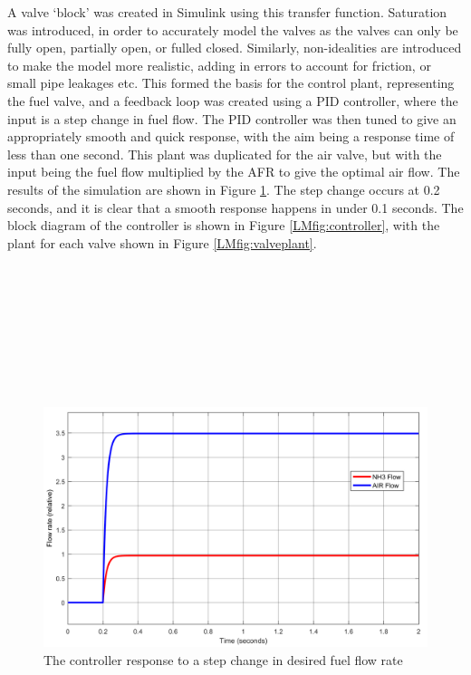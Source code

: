 \documentclass{article}
\begin{document}
A valve `block' was created in Simulink using this transfer function. Saturation was introduced, in order to accurately model the valves as the valves can only be fully open, partially open, or fulled closed. Similarly, non-idealities are introduced to make the model more realistic, adding in errors to account for friction, or small pipe leakages etc. This formed the basis for the control plant, representing the fuel valve, and a feedback loop was created using a PID controller, where the input is a step change in fuel flow. The PID controller was then tuned to give an appropriately smooth and quick response, with the aim being a response time of less than one second. This plant was duplicated for the air valve, but with the input being the fuel flow multiplied by the AFR to give the optimal air flow. The results of the simulation are shown in Figure \ref{LMfig:controlresults}. The step change occurs at 0.2 seconds, and it is clear that a smooth response happens in under 0.1 seconds. The block diagram of the controller is shown in Figure \ref{LMfig:controller}, with the plant for each valve shown in Figure \ref{LMfig:valveplant}.\\ \\ \ \\ \\
\hspace{1cm}\\
\hspace{1cm}\\
\hspace{1cm}\\
\hspace{1cm}\\
\hspace{1cm}\\


\begin{figure}[h]
    \centering
    \includegraphics[scale=0.3]{controllerresponse.png}
    \caption{The controller response to a step change in desired fuel flow rate}
    \label{LMfig:controlresults}
\end{figure}
\end{document}
